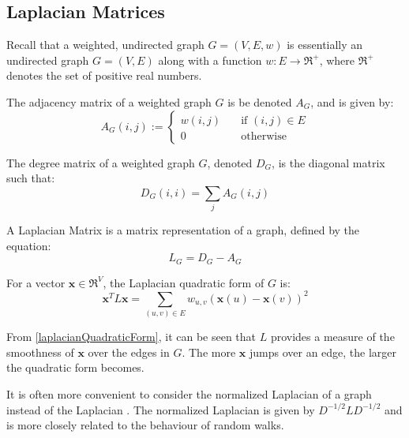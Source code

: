 \subsection{Laplacian Matrices}
\label{laplacianMatrices}
\nocite{Berkeley:1999,Pati:2011,Spielman:2006}
Recall that a weighted, undirected graph $G = (V,E,w)$ is essentially an
undirected graph $G = (V,E)$ along with a function $w : E \rightarrow \Re^+$,
where $\Re^+$ denotes the set of positive real numbers.

The adjacency matrix of a weighted graph $G$ is be denoted $A_G$, and is given
by:
\begin{equation}
A_{G}(i,j) :=
    \left\{
        \begin{array}{ll}
            \mathit{w}(i,j) &   \quad \text{if $(i,j) \in E$}\\
            0 &                 \quad \text{otherwise}
        \end{array}
    \right.
\end{equation}

The degree matrix of a weighted graph $G$, denoted $D_G$, is the diagonal matrix
such that:
\begin{equation}
D_G(i,i) = \sum_j A_G(i,j)
\end{equation}

A Laplacian Matrix is a matrix representation of a graph, defined by the
equation:
\begin{equation}
L_G = D_G - A_G
\end{equation}

For a vector $\textbf{x} \in \Re^V$, the Laplacian quadratic form of $G$ is:
\begin{equation}
\label{laplacianQuadraticForm}
\textbf{x}^T L \textbf{x} = \sum_{(u,v) \in E} w_{u,v}(\textbf{x}(u) - \textbf{x}(v))^2
\end{equation}

From \autoref{laplacianQuadraticForm}, it can be seen that $L$ provides a
measure of the smoothness of $\textbf{x}$ over the edges in $G$. The more
$\textbf{x}$ jumps over an edge, the larger the quadratic form becomes.

It is often more convenient to consider the normalized Laplacian of a graph
instead of the Laplacian \cite{Spielman:2010}. The normalized Laplacian is given
by $D^{-1/2}LD^{-1/2}$ and is more closely related to the behaviour of random
walks.

